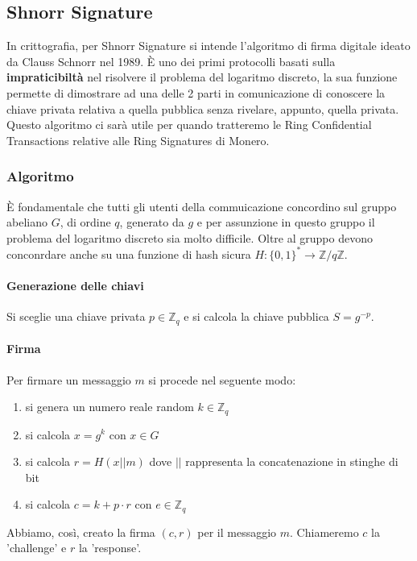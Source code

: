 \documentclass[12pt,a4paper]{article}
\begin{document}
\subsection{Shnorr Signature}
In crittografia, per Shnorr Signature si intende l'algoritmo di firma digitale
ideato da Clauss Schnorr nel 1989. È uno dei primi protocolli basati sulla
\textbf{impraticibiltà} nel risolvere il problema del logaritmo discreto, la sua
funzione permette di dimostrare ad una delle 2 parti in comunicazione di
conoscere la chiave privata relativa a quella pubblica senza rivelare, appunto,
quella privata. Questo algoritmo ci sarà utile per quando tratteremo le Ring Confidential Transactions relative alle Ring Signatures di Monero.

\subsubsection*{Algoritmo}

È fondamentale che tutti gli utenti della commuicazione concordino sul gruppo
abeliano $ G $, di ordine $ q $, generato da $ g $ e per assunzione in questo
gruppo il problema del logaritmo discreto sia molto difficile. Oltre al gruppo
devono conconrdare anche su una funzione di hash sicura $ H:\{0,1\}^*
\rightarrow \mathbb{Z} / q\mathbb{Z} $.

\paragraph{Generazione delle chiavi}
Si sceglie una chiave privata $ p \in \mathbb{Z}_q $ e si calcola la chiave
pubblica $ S = g^{-p} $.

\paragraph{Firma}
Per firmare un messaggio $ m $ si procede nel seguente modo:
\begin{enumerate}
    \item si genera un numero reale random $ k \in \mathbb{Z}_q $
    \item si calcola $ x = g^k $ con $ x \in G $ 
    \item si calcola $ r = H(x || m) $ dove $ || $ rappresenta la concatenazione
    in stinghe di bit
    \item si calcola $ c = k + p \cdot r $ con $ e \in \mathbb{Z}_q $
\end{enumerate}

Abbiamo, così, creato la firma $ (c, r) $ per il messaggio $ m $. Chiameremo $ c
$ la 'challenge' e $ r $ la 'response'.
\end{document}
